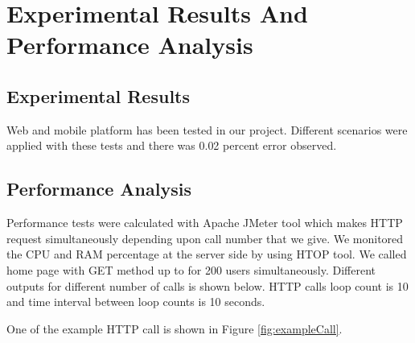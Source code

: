 \chapter{Experimental Results And Performance Analysis}


\section{Experimental Results}
Web and mobile platform has been tested in our project. Different scenarios were applied with these tests and there was 0.02 percent error observed.

\section{Performance Analysis}

Performance tests were calculated with Apache JMeter tool which makes HTTP request simultaneously depending upon call number that we give. We monitored the CPU and RAM percentage at the server side by using HTOP tool. We called home page with GET method up to for 200 users simultaneously. Different outputs for different number of calls is shown below. HTTP calls loop count is 10 and time interval between loop counts is 10 seconds.

One of the example HTTP call is shown in Figure 
\ref{fig:exampleCall}.

